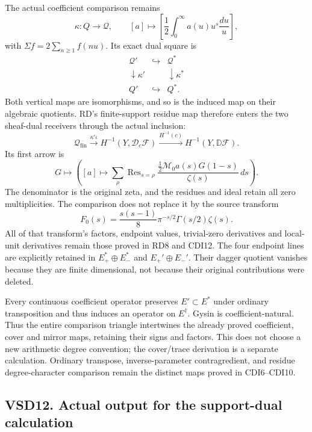 The actual coefficient comparison remains \[
\kappa:Q\longrightarrow\mathcal Q,\qquad
[a]\longmapsto\left[\frac12\int_0^\infty a(u)u^s\frac{du}{u}\right],
\tag{VSD11.1}
\] with \(\Sigma f=2\sum_{n\ge1}f(nu)\). Its exact dual square is \[
\begin{array}{ccc}
\mathcal Q'&\hookrightarrow&\mathcal Q^*\\
\downarrow\kappa'&&\downarrow\kappa^*\\
Q'&\hookrightarrow&Q^* .
\end{array}
\tag{VSD11.2}
\] Both vertical maps are isomorphisms, and so is the induced map on
their algebraic quotients. RD's finite-support residue map therefore
enters the two sheaf-dual receivers through the actual inclusion: \[
\mathcal Q_{\mathrm{fin}}
\xrightarrow{\kappa'\iota}H^{-1}(Y,\mathscr D_c\mathscr F)
\xrightarrow{H^{-1}(c)}H^{-1}(Y,\mathbb D\mathscr F).
\tag{VSD11.3}
\] Its first arrow is \[
G\longmapsto\left([a]\longmapsto
\sum_\rho\operatorname{Res}_{s=\rho}
\frac{\tfrac12\mathcal M_0a(s)G(1-s)}{\zeta(s)}\,ds\right).
\tag{VSD11.4}
\] The denominator is the original zeta, and the residues and ideal
retain all zero multiplicities. The comparison does not replace it by
the source transform \[
F_0(s)=\frac{s(s-1)}8\pi^{-s/2}\Gamma(s/2)\zeta(s).
\tag{VSD11.5}
\] All of that transform's factors, endpoint values, trivial-zero
derivatives and local-unit derivatives remain those proved in RD8 and
CDI12. The four endpoint lines are explicitly retained in
\(E_+^*\oplus E_-^*\) and \(E_+'\oplus E_-'\). Their dagger quotient
vanishes because they are finite dimensional, not because their original
contributions were deleted.

Every continuous coefficient operator preserves \(E'\subset E^*\) under
ordinary transposition and thus induces an operator on \(E^\dagger\).
Gysin is coefficient-natural. Thus the entire comparison triangle
intertwines the already proved coefficient, cover and mirror maps,
retaining their signs and factors. This does not choose a new arithmetic
degree convention; the cover/trace derivation is a separate calculation.
Ordinary transpose, inverse-parameter contragredient, and residue
degree-character comparison remain the distinct maps proved in
CDI6--CDI10.

\subsection{VSD12. Actual output for the support-dual
calculation}\label{vsd12.-actual-output-for-the-support-dual-calculation}

